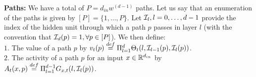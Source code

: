 
\textbf{Paths:} We have a total of $P=d_{in}w^{(d-1)}$ paths. Let us say that an enumeration of the paths is given by $[P]=\{1,\ldots,P\}$. Let $\mathcal{I}_{l},l=0,\ldots,d-1$ provide the index of the hidden unit through which a path $p$ passes in layer $l$ (with the convention that $\mathcal{I}_d(p)=1,\forall p\in [P]$). We then define:\\
$1.$ The value of a path $p$ by $v_t(p)\stackrel{def}=\Pi_{l=1}^d \Theta_t(l,\mathcal{I}_{l-1}(p),\mathcal{I}_l(p))$.\\
$2.$ The activity of a path $p$ for an input $x\in \mathbb{R}^{d_{in}}$ by $A_{t}(x,p)\stackrel{def}{=}\Pi_{l=1}^{d-1} G_{x,t}(l,\mathcal{I}_l(p))$.\\
\begin{comment}
\FloatBarrier
\begin{table}[h]
\begin{minipage}{0.5\columnwidth}
\resizebox{\columnwidth}{!}{
\begin{tabular}{|c|l|}\hline								 								 													
NPF		&$\phi_{x,t}=(x(\I_0(p))A_t(x,p) ,p\in[P])\in \R^P$\\\hline	
OASN	&$\lambda_t(x,x')=\sum_{p\rsa i} A_t(x,p) A_t(x',p)$\\\hline
NPK		&$H_t(x,x')=\ip{\phi_{x,t},\phi_{x',t}}$\\\hline		
VTP		&$\varphi^v_{p,t}=(\partial_{\theta}v_t(p),\theta\in\Theta)\inrdnet$ \\\hline	
VG		&$\psi^v_{x,t}=\nabla_{\Theta} \hat{y}_t(x)\in\R^{d_{net}}$\\\hline
\end{tabular}
}
\end{minipage}
\begin{minipage}{0.5\columnwidth}
\resizebox{\columnwidth}{!}{
\begin{tabular}{|c|l|}\hline								 								 													
ATP		&$\varphi^a_{x,p,t}=(\partial_{\tg}A_t(x,p),\tg\in\Tg)\inrdnet$ \\\hline	
FG		&$\psi^{\phi}_{x,t}=\nabla_{\Tg} \hat{y}_t(x)\in\R^{d_{net}}$\\\hline
OSSN 	&$\delta_t(x,x')=\sum_{p\rsa i} \ip{\varphi^a_{x,p,t},\varphi^a_{x',p,t}}$\\\hline
NTF		&$\psi_{x,t}=(\psi^v_{x,t},\psi^{\phi}_{x,t})\in\R^{2d_{net}}$\\\hline
NTK 		&$K_t(x,x')=\ip{\psi_{x,t}\psi_{x',t}}$\\\hline
\end{tabular}
}
\end{minipage}
\caption{Shows all zeroth-order and first-order quantities related to information flow in a DGN.}
\label{tb:terms}
\end{table}
\end{comment}
